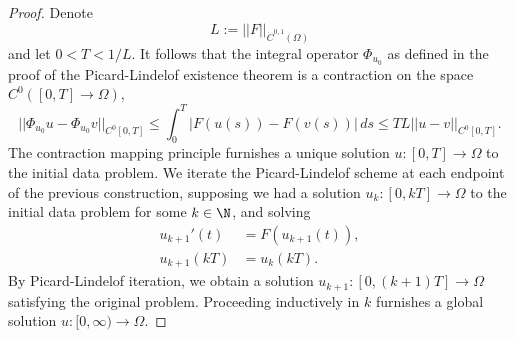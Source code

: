 \begin{proof}
	Denote
		\[ L := ||F||_{\dot C^{0, 1} (\Omega)} \]
	and let $0 < T < 1/L$. It follows that the integral operator $\Phi_{u_0}$ as defined in the proof of the Picard-Lindelof existence theorem is a contraction on the space $C^0([0, T] \to \Omega)$, 
		\[ ||\Phi_{u_0}u  - \Phi_{u_0} v||_{C^0[0, T]}\leq  \int_0^T |F(u(s)) - F(v(s))| \, ds \leq TL ||u - v||_{C^0[0, T]}. \]
	The contraction mapping principle furnishes a unique solution $u : [0, T] \to \Omega$ to the initial data problem. We iterate the Picard-Lindelof scheme at each endpoint of the previous construction, supposing we had a solution $u_k : [0, kT] \to \Omega$ to the initial data problem for some $k \in \N$, and solving 
		\begin{align*}
			u_{k + 1}' (t) &= F(u_{k + 1} (t)), \\
			u_{k + 1} (kT)	&= u_k (kT).
		\end{align*}
	By Picard-Lindelof iteration, we obtain a solution $u_{k + 1} : [0, (k + 1) T] \to \Omega$ satisfying the original problem. Proceeding inductively in $k$ furnishes a global solution $u: [0, \infty) \to \Omega$.
\end{proof}
